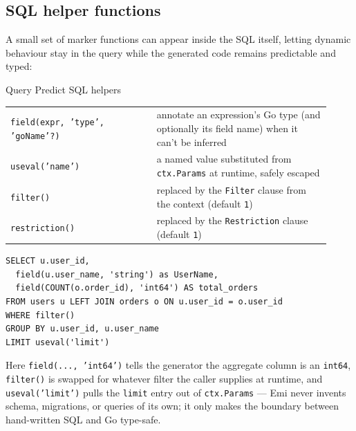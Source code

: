 \subsection{SQL helper functions}
A small set of marker functions can appear inside the SQL itself, letting
dynamic behaviour stay in the query while the generated code remains
predictable and typed:
\begin{sidebar}{Query Predict SQL helpers}
\small
\begin{tabular}{@{}p{0.42\linewidth}p{0.5\linewidth}@{}}
\texttt{field(expr, 'type', 'goName'?)} & annotate an expression's Go type (and optionally its field name) when it can't be inferred \\
\texttt{useval('name')} & a named value substituted from \texttt{ctx.Params} at runtime, safely escaped \\
\texttt{filter()} & replaced by the \texttt{Filter} clause from the context (default \texttt{1}) \\
\texttt{restriction()} & replaced by the \texttt{Restriction} clause (default \texttt{1}) \\
\end{tabular}
\end{sidebar}
\begin{lstlisting}
SELECT u.user_id,
  field(u.user_name, 'string') as UserName,
  field(COUNT(o.order_id), 'int64') AS total_orders
FROM users u LEFT JOIN orders o ON u.user_id = o.user_id
WHERE filter()
GROUP BY u.user_id, u.user_name
LIMIT useval('limit')
\end{lstlisting}
Here \texttt{field(..., 'int64')} tells the generator the aggregate
column is an \texttt{int64}, \texttt{filter()} is swapped for whatever
filter the caller supplies at runtime, and \texttt{useval('limit')} pulls
the \texttt{limit} entry out of \texttt{ctx.Params} --- Emi never invents
schema, migrations, or queries of its own; it only makes the boundary
between hand-written SQL and Go type-safe.
